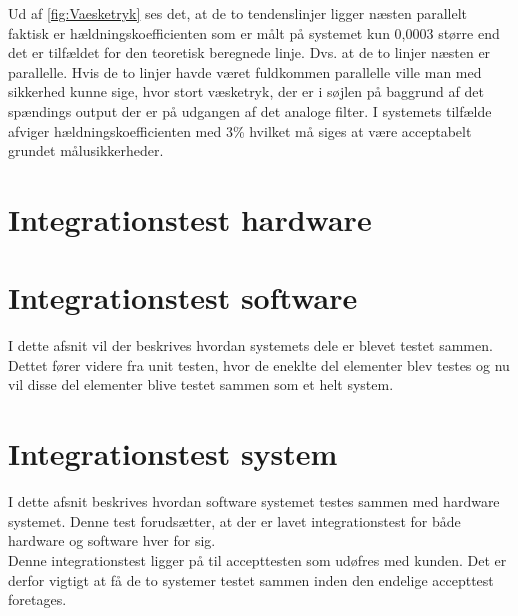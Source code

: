 Ud af \ref{fig:Vaesketryk} ses det, at de to tendenslinjer ligger næsten parallelt faktisk er hældningskoefficienten som er målt på systemet kun 0,0003 større end det er tilfældet for den teoretisk beregnede linje. Dvs. at de to linjer næsten er parallelle. Hvis de to linjer havde været fuldkommen parallelle ville man med sikkerhed kunne sige, hvor stort væsketryk, der er i søjlen på baggrund af det spændings output der er på udgangen af det analoge filter. I systemets tilfælde afviger hældningskoefficienten med 3\% hvilket må siges at være acceptabelt grundet målusikkerheder.


\section{Integrationstest hardware}


\section{Integrationstest software}
I dette afsnit vil der beskrives hvordan systemets dele er blevet testet sammen. Dettet fører videre fra unit testen, hvor de eneklte del elementer blev testes og nu vil disse del elementer blive testet sammen som et helt system. 

\section{Integrationstest system}
I dette afsnit beskrives hvordan software systemet testes sammen med hardware systemet. Denne test forudsætter, at der er lavet integrationstest for både hardware og software hver for sig. \\
Denne integrationstest ligger på til accepttesten som udøfres med kunden. Det er derfor vigtigt at få de to systemer testet sammen inden den endelige accepttest foretages. 
